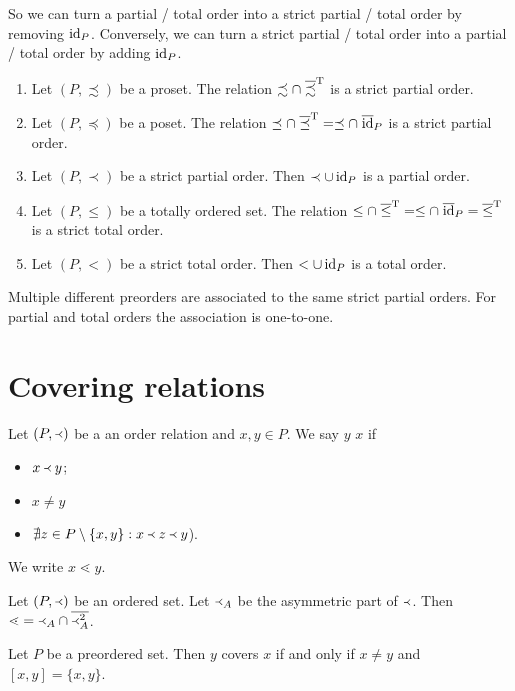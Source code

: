 So we can turn a partial / total order into a strict partial / total order by removing $\operatorname{id}_P$. Conversely, we can turn a strict partial / total order into a partial / total order by adding $\operatorname{id}_P$.

\begin{proposition}
\mbox{}
\begin{enumerate}
\item Let $(P, \precsim)$ be a proset. The relation $\precsim \cap\; \overline{\precsim}^{\mathrm{T}}$
is a strict partial order.
\item Let $(P, \preceq)$ be a poset. The relation $\preceq \cap \;\overline{\preceq}^{\mathrm{T}} = \preceq \cap\; \overline{\operatorname{id}}_P$
is a strict partial order.
\item Let $(P, \prec)$ be a strict partial order. Then $\prec \cup \operatorname{id}_P$ is a partial order.
\item Let $(P, \leq)$ be a totally ordered set. The relation $\leq \cap\; \overline{\leq}^{\mathrm{T}} = \leq \cap\; \overline{\operatorname{id}}_P = \overline{\leq}^{\mathrm{T}}$
is a strict total order.
\item Let $(P, <)$ be a strict total order. Then $< \cup \operatorname{id}_P$ is a total order.
\end{enumerate}
Multiple different preorders are associated to the same strict partial orders. For partial and total orders the association is one-to-one.
\end{proposition}

\section{Covering relations}
\begin{definition}
Let $(P,\Yleft)$ be a an order relation and $x,y\in P$. We say $y$  $x$ if
\begin{itemize}
\item $x\Yleft y$;
\item $x\neq y$
\item $\nexists z\in P\setminus\{x,y\}: x\Yleft z \Yleft y$).
\end{itemize}
We write $x\lessdot y$.
\end{definition}

\begin{lemma}
Let $(P,\Yleft)$ be an ordered set. Let $\Yleft_A$ be the asymmetric part of $\Yleft$. Then $\lessdot = \Yleft_A \cap \overline{\Yleft_A^2}$.
\end{lemma}

\begin{lemma}
Let $P$ be a preordered set. Then $y$ covers $x$ \textup{if and only if} $x\neq y$ and $[x,y] = \{x,y\}$.
\end{lemma}

